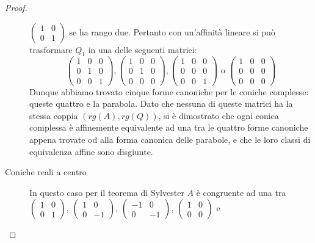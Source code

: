 \begin{proof}
\begin{description}
 $\left(\begin{smallmatrix} 1 & 0 \\ 0 & 1 \end{smallmatrix}\right)$ se ha rango due. Pertanto con un'affinità lineare si può trasformare $Q_1$
 in una delle seguenti matrici:
 $$\left( \begin{array}{ccc}
   1 & 0 & 0\\
   0 & 1 & 0\\
   0 & 0 & 1
  \end{array} \right) ,
  \left(\begin{array}{ccc}
   1 & 0 & 0\\
   0 & 1 & 0\\
   0 & 0 & 0\end{array}\right),
   \left(\begin{array}{ccc}
   1 & 0 & 0\\
   0 & 0 & 0\\
   0 & 0 & 1\end{array}\right)
   \text{ o }\left(\begin{array}{ccc}
   1 & 0 & 0\\
   0 & 0 & 0\\
   0 & 0 & 0\end{array}\right) $$
   Dunque abbiamo trovato cinque forme canoniche per le coniche complesse: queste quattro e la parabola.
 Dato che nessuna di queste matrici ha la stessa coppia $(rg(A), rg(Q))$, si è dimostrato che ogni conica complessa è affinemente
 equivalente ad una tra le quattro forme canoniche appena trovate od alla forma canonica delle parabole, e che le loro classi di equivalenza
 affine sono disgiunte.
 \item[Coniche reali a centro] In questo caso per il teorema di Sylvester $A$ è congruente ad una tra
 $\left(\begin{smallmatrix} 1 & 0 \\ 0 & 1 \end{smallmatrix}\right)$, $\left(\begin{smallmatrix} 1 & 0 \\ 0 & -1 \end{smallmatrix}\right)$,
 $\left(\begin{smallmatrix} -1 & 0 \\ 0 & -1 \end{smallmatrix}\right)$, $\left(\begin{smallmatrix} 1 & 0 \\ 0 & 0 \end{smallmatrix}\right)$ e

\end{description}
\end{proof}
